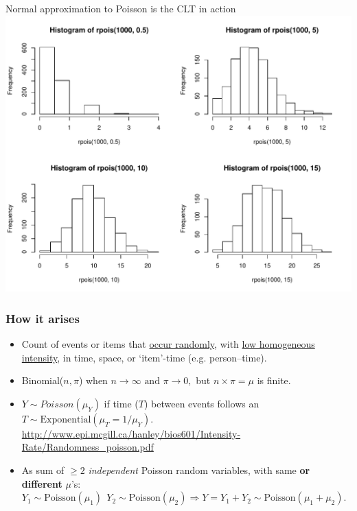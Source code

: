 \documentclass[10pt]{beamer}\usepackage[]{graphicx}\usepackage[]{color}
\begin{document}
\begin{frame}{Normal approximation to Poisson is the CLT in action}
	\includegraphics[width=\linewidth]{hist-pois-1} 
\end{frame}	



\begin{frame}
	\frametitle{How it arises}
	
	
	\begin{itemize}
		\setlength\itemsep{1em}
		\item  Count of events or items that \underline{occur randomly}, with \underline{low homogeneous intensity}, in time, space, or `item'-time (e.g. person--time). 
		\item Binomial($n,\pi$) when $n \rightarrow \infty\textrm{ and } \pi \rightarrow 0,$ but $n \times \pi = \mu$ is finite.
		\item $Y\sim Poisson(\mu_Y)$ if time ($T$) between events follows an $T \sim \textrm{Exponential}(\mu_{T} = 1/\mu_{Y}).$ 
		{ \scriptsize   \url{http://www.epi.mcgill.ca/hanley/bios601/Intensity-Rate/Randomness_poisson.pdf}} 
		\item  As sum of $\ge 2$  \textit{independent} Poisson random variables, 
		with same \textbf{or different} $\mu$'s: \newline 
		$Y_{1} \sim \textrm{Poisson}(\mu_{1}) \: \:   
		Y_{2} \sim \textrm{Poisson}(\mu_{2}) \Rightarrow Y = Y_{1} + Y_{2} \sim \textrm{Poisson}(\mu_{1}+\mu_{2}).$
	\end{itemize}
\end{frame}
\end{document}
